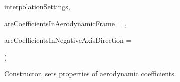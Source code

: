 {\begin{DoxyParamCaption}
\item[{const boost\+::shared\+\_\+ptr$<$ {\bf interpolators\+::\+Interpolator\+Settings} $>$}]{interpolation\+Settings, }
\item[{const bool}]{are\+Coefficients\+In\+Aerodynamic\+Frame = {}, }
\item[{const bool}]{are\+Coefficients\+In\+Negative\+Axis\+Direction = {}}
\end{DoxyParamCaption}
)\hspace{0.3cm}{\ttfamily [inline]}}\hypertarget{classtudat_1_1simulation__setup_1_1TabulatedAerodynamicCoefficientSettings_3_011_01_4_aaa7de23b189f8461b9bcec784cadc070}{}\label{classtudat_1_1simulation__setup_1_1TabulatedAerodynamicCoefficientSettings_3_011_01_4_aaa7de23b189f8461b9bcec784cadc070}


Constructor, sets properties of aerodynamic coefficients. 

